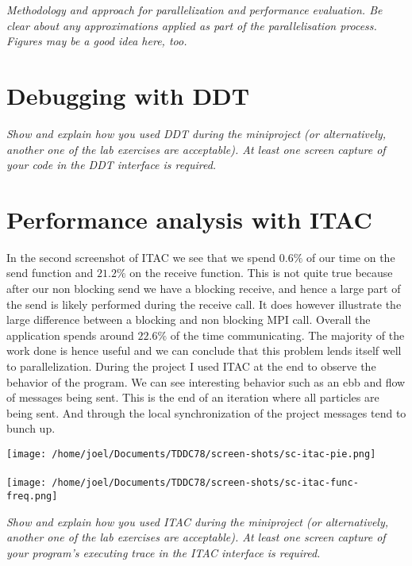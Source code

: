 \documentclass{article}
\begin{document}
\emph{Methodology and approach for parallelization and performance evaluation.
Be clear about any approximations applied as part of the parallelisation process.
 Figures may be a good idea here, too.}

\section{Debugging with DDT}

\emph{Show and explain how you used DDT during the miniproject (or alternatively, another one of the lab exercises are acceptable). At least one screen capture of your code in the DDT interface is required.}

\section{Performance analysis with ITAC}
In the second screenshot of ITAC we see that we spend $0.6\%$ of our time on the send function and $21.2\%$ on the receive function. This is not quite true because after our non blocking send we have a blocking receive, and hence a large part of the send is likely performed during the receive call. It does however illustrate the large difference between a blocking and non blocking MPI call. Overall the application spends around $22.6\%$ of the time communicating. The majority of the work done is hence useful and we can conclude that this problem lends itself well to parallelization. During the project I used ITAC at the end to observe the behavior of the program. We can see interesting behavior such as an ebb and flow of messages being sent. This is the end of an iteration where all particles are being sent. And through the local synchronization of the project messages tend to bunch up.


\texttt{[image: /home/joel/Documents/TDDC78/screen-shots/sc-itac-pie.png]} \\ \\


\texttt{[image: /home/joel/Documents/TDDC78/screen-shots/sc-itac-func-freq.png]}



\emph{Show and explain how you used ITAC during the miniproject (or alternatively, another one of the lab exercises are acceptable). At least one screen capture of your program's executing trace in the ITAC interface is required.}
\end{document}
